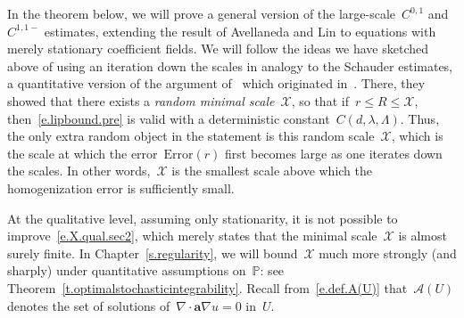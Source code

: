\documentclass[11pt,twoside]{article} %
\numberwithin{equation}{section}
\theoremstyle{definition}
\renewcommand{\a}{\mathbf{a}}
\renewcommand{\P}{\mathbb{P}}
\newcommand{\X}{\mathcal{X}}
\newcommand{\A}{\mathcal{A}}
\begin{document}
In the theorem below, we will prove a general version of the large-scale~$C^{0,1}$ and~$C^{1,1-}$ estimates, extending the result of Avellaneda and Lin to equations with merely stationary coefficient fields. 
We will follow the ideas we have sketched above of using an iteration down the scales in analogy to the Schauder estimates, a quantitative version of the argument of~\cite{AL1} which originated in~\cite{AS}.
There, they showed that there exists a \emph{random minimal scale}~$\X$, so that if~$r \leq R \leq \X$, then~\eqref{e.lipbound.pre} is valid with a deterministic constant~$C(d,\lambda,\Lambda)$. Thus, the only extra random object in the statement is this random scale~$\X$, which is the scale at which the error~$\mathrm{Error}(r)$ first becomes large as one iterates down the scales. In other words,~$\X$ is the smallest scale above which the homogenization error is sufficiently small. 

\smallskip

At the qualitative level, assuming only stationarity, it is not possible to improve~\eqref{e.X.qual.sec2}, which merely states that the minimal scale~$\X$ is almost surely finite. In Chapter~\ref{s.regularity}, we will bound~$\X$ much more strongly (and sharply) under quantitative assumptions on~$\P$: see Theorem~\ref{t.optimalstochasticintegrability}. Recall from~\eqref{e.def.A(U)} that~$\A(U)$ denotes the set of solutions of~$\nabla \cdot \a\nabla u=0$ in~$U$. 
\end{document}
